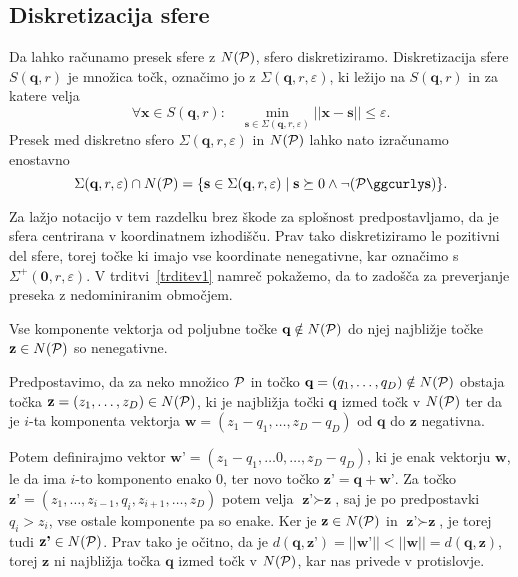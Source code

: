 \subsection{Diskretizacija sfere}
Da lahko računamo presek sfere z $N(\P)$, sfero diskretiziramo. Diskretizacija sfere $S(\textbf{q}, r)$ je množica točk, označimo jo z $\Sigma(\textbf{q}, r, \varepsilon)$, ki ležijo na $S(\textbf{q}, r)$ in za katere velja
\[
\forall \textbf{x} \in S(\textbf{q}, r): \quad \min_{\textbf{s} \in \Sigma(\textbf{q}, r, \varepsilon)} ||\textbf{x} - \textbf{s}|| \leq \varepsilon.
\]
Presek med diskretno sfero $\Sigma(\textbf{q}, r, \varepsilon)$ in $N(\P)$ lahko nato izračunamo enostavno
\[
\Sigma(\textbf{q}, r, \varepsilon) \cap N(\P) = \{ \textbf{s} \in \Sigma(\textbf{q}, r, \varepsilon) \mid \textbf{s} \succeq 0 \land \neg  (\P \ggcurly \textbf{s}) \}.
\]

Za lažjo notacijo v tem razdelku brez škode za splošnost predpostavljamo, da je sfera centrirana v koordinatnem izhodišču. Prav tako diskretiziramo le pozitivni del sfere, torej točke ki imajo vse koordinate nenegativne, kar označimo s $\Sigma^+(\textbf{0}, r, \varepsilon)$. V trditvi~\ref{trditev1} namreč pokažemo, da to zadošča za preverjanje preseka z nedominiranim območjem. 

\begin{trditev} \label{trditev1}
Vse komponente vektorja od poljubne točke $\textbf{q} \notin N(\P)$ do njej najbližje točke $\textbf{z} \in N(\P)$ so nenegativne.
\end{trditev}

\begin{dokaz}
Predpostavimo, da za neko množico $\P$ in točko $\textbf{q} = (q_1, \dots, q_D) \notin N(\P)$ obstaja točka $\textbf{z} = (z_1, \dots, z_D) \in N(\P)$, ki je najbližja točki $\textbf{q}$ izmed točk v $N(\P)$ ter da je $i$-ta komponenta vektorja $\textbf{w} = (z_1 - q_1, \dots, z_D - q_D)$ od $\textbf{q}$ do $\textbf{z}$ negativna. 

Potem definirajmo vektor $\textbf{w'} = (z_1 - q_1, \dots 0, \dots, z_D - q_D)$, ki je enak vektorju $\textbf{w}$, le da ima $i$-to komponento enako $0$, ter novo točko $\textbf{z'} = \textbf{q} + \textbf{w'}$.
Za točko $\textbf{z'} = (z_1, \dots, z_{i-1}, q_i, z_{i+1}, \dots, z_D)$ potem velja $\textbf{z'} \succ \textbf{z}$, saj je po predpostavki $q_i > z_i$, vse ostale komponente pa so enake. Ker je $\textbf{z} \in N(\P)$ in $\textbf{z'} \succ \textbf{z}$, je torej tudi $\textbf{z'} \in N(\P)$. Prav tako je očitno, da je $d(\textbf{q}, \textbf{z'}) = || \textbf{w'} || < || \textbf{w} || = d(\textbf{q}, \textbf{z})$, torej $\textbf{z}$ ni najbližja točka $\textbf{q}$ izmed točk v $N(\P)$, kar nas privede v protislovje. 
\end{dokaz}


